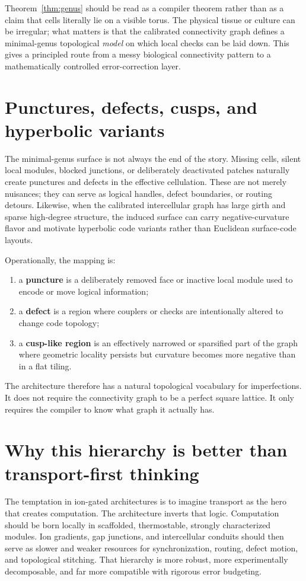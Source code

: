 \documentclass[11pt]{report}
\theoremstyle{definition}
\begin{document}
Theorem~\ref{thm:genus} should be read as a compiler theorem rather than as a claim that cells literally lie on a visible torus. The physical tissue or culture can be irregular; what matters is that the calibrated connectivity graph defines a minimal-genus topological \emph{model} on which local checks can be laid down. This gives a principled route from a messy biological connectivity pattern to a mathematically controlled error-correction layer.

\section{Punctures, defects, cusps, and hyperbolic variants}
The minimal-genus surface is not always the end of the story. Missing cells, silent local modules, blocked junctions, or deliberately deactivated patches naturally create punctures and defects in the effective cellulation. These are not merely nuisances; they can serve as logical handles, defect boundaries, or routing detours. Likewise, when the calibrated intercellular graph has large girth and sparse high-degree structure, the induced surface can carry negative-curvature flavor and motivate hyperbolic code variants rather than Euclidean surface-code layouts.

Operationally, the mapping is:

\begin{enumerate}[leftmargin=2em]
\item a \textbf{puncture} is a deliberately removed face or inactive local module used to encode or move logical information;
\item a \textbf{defect} is a region where couplers or checks are intentionally altered to change code topology;
\item a \textbf{cusp-like region} is an effectively narrowed or sparsified part of the graph where geometric locality persists but curvature becomes more negative than in a flat tiling.
\end{enumerate}

The architecture therefore has a natural topological vocabulary for imperfections. It does not require the connectivity graph to be a perfect square lattice. It only requires the compiler to know what graph it actually has.

\section{Why this hierarchy is better than transport-first thinking}
The temptation in ion-gated architectures is to imagine transport as the hero that creates computation. The architecture inverts that logic. Computation should be born locally in scaffolded, thermostable, strongly characterized modules. Ion gradients, gap junctions, and intercellular conduits should then serve as slower and weaker resources for synchronization, routing, defect motion, and topological stitching. That hierarchy is more robust, more experimentally decomposable, and far more compatible with rigorous error budgeting.
\end{document}
